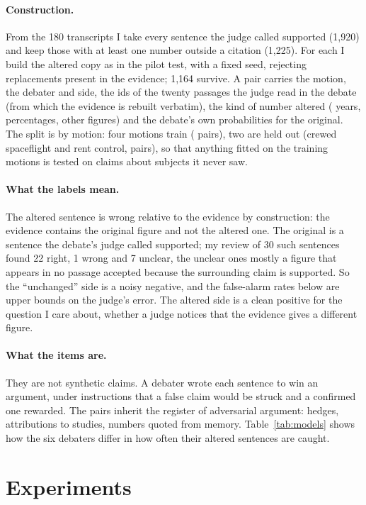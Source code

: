 \documentclass[11pt,a4paper]{article}
\begin{document}
\paragraph{Construction.} From the 180 transcripts I take every sentence the judge called supported (1,920) and keep those with at least one number outside a citation (1,225). For each I build the altered copy as in the pilot test, with a fixed seed, rejecting replacements present in the evidence; 1,164 survive. A pair carries the motion, the debater and side, the ids of the twenty passages the judge read in the debate (from which the evidence is rebuilt verbatim), the kind of number altered (\nYear{} years, \nPercent{} percentages, \nOther{} other figures) and the debate's own probabilities for the original. The split is by motion: four motions train (\nTrain{} pairs), two are held out (crewed spaceflight and rent control, \nTest{} pairs), so that anything fitted on the training motions is tested on claims about subjects it never saw.

\paragraph{What the labels mean.} The altered sentence is wrong relative to the evidence by construction: the evidence contains the original figure and not the altered one. The original is a sentence the debate's judge called supported; my review of 30 such sentences found 22 right, 1 wrong and 7 unclear, the unclear ones mostly a figure that appears in no passage accepted because the surrounding claim is supported. So the ``unchanged'' side is a noisy negative, and the false-alarm rates below are upper bounds on the judge's error. The altered side is a clean positive for the question I care about, whether a judge notices that the evidence gives a different figure.

\paragraph{What the items are.} They are not synthetic claims. A debater wrote each sentence to win an argument, under instructions that a false claim would be struck and a confirmed one rewarded. The pairs inherit the register of adversarial argument: hedges, attributions to studies, numbers quoted from memory. Table~\ref{tab:models} shows how the six debaters differ in how often their altered sentences are caught.

\section{Experiments}
\label{sec:experiments}
\end{document}
